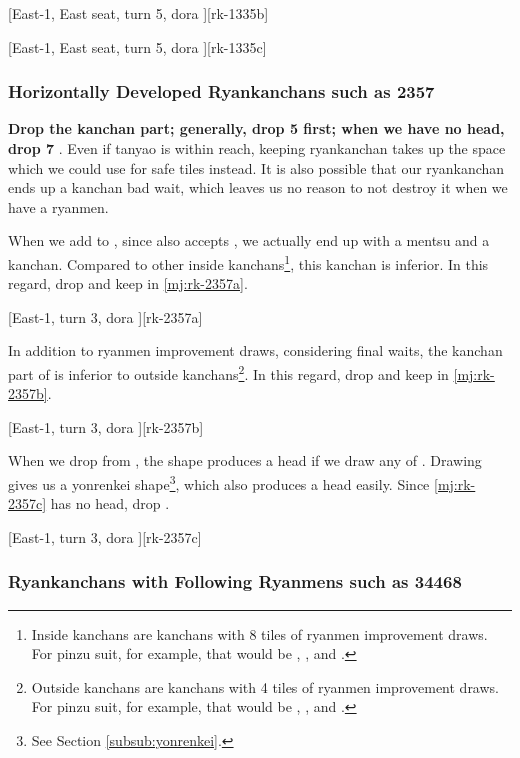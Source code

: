 \documentclass[12pt]{article}
\newlength\stdbls %
\newcommand{\mjfn}[1]{\raisebox{-.135\stdbls}{\mahjong[0.75\stdbls]{#1}}}
\begin{document}
[East-1, East seat, turn 5, dora ][rk-1335b]

[East-1, East seat, turn 5, dora ][rk-1335c]


\subsubsection*{Horizontally Developed Ryankanchans such as 2357}

\textbf{Drop the kanchan part; generally, drop 5 first; when we have no head, drop 7} \citep{yuusee-2357}. Even if tanyao is within reach, keeping ryankanchan takes up the space which we could use for safe tiles instead. It is also possible that our ryankanchan ends up a kanchan bad wait, which leaves us no reason to not destroy it when we have a ryanmen.

When we add  to , since  also accepts , we actually end up with a mentsu and a kanchan. Compared to other inside kanchans\footnote{Inside kanchans are kanchans with 8 tiles of ryanmen improvement draws. For pinzu suit, for example, that would be \mjfn{35p}, \mjfn{46p}, and \mjfn{57p}.}, this  kanchan is inferior. In this regard, drop  and keep  in \ref{mj:rk-2357a}.

[East-1, turn 3, dora ][rk-2357a]

In addition to ryanmen improvement draws, considering final waits, the kanchan part of  is inferior to outside kanchans\footnote{Outside kanchans are kanchans with 4 tiles of ryanmen improvement draws. For pinzu suit, for example, that would be \mjfn{13p}, \mjfn{24p}, \mjfn{68p} and \mjfn{79p}.}. In this regard, drop  and keep  in \ref{mj:rk-2357b}.

[East-1, turn 3, dora ][rk-2357b]

When we drop  from , the  shape produces a head if we draw any of . Drawing  gives us a yonrenkei shape\footnote{See Section \ref{subsub:yonrenkei}.}, which also produces a head easily. Since \ref{mj:rk-2357c} has no head, drop .

[East-1, turn 3, dora ][rk-2357c]


\subsubsection*{Ryankanchans with Following Ryanmens such as 34468}
\end{document}
